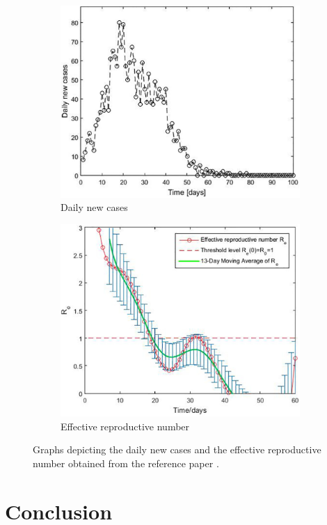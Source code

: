 \documentclass[a4paper]{article}
\begin{document}
\begin{figure}[h!]
	\centering
	\begin{subfigure}{.5\textwidth}
		\centering
		\includegraphics[width=\textwidth]{images/dnc-orig.jpg}
		\caption{Daily new cases}
		\label{figure:rp-dnc}
	\end{subfigure}%
	\begin{subfigure}{.5\textwidth}
		\centering
		\includegraphics[width=\textwidth]{images/r_e-orig.jpg}
		\caption{Effective reproductive number}
		\label{figure:rp-r-e}
	\end{subfigure}
	\caption{Graphs depicting the daily new cases and the effective reproductive number obtained from the reference paper \cite{Maltezos2021}.}
	\label{figure:results-reference-paper}
\end{figure}




\section{Conclusion}\label{section:conclusion}





 
\end{document}
